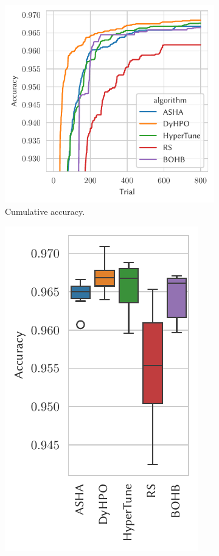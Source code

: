 \begin{figure}[H]
    \begin{subfigure}{.47\textwidth}
        \includegraphics[height=\plotheight]{img/real_exp/svhn_residual_plot.pdf}%
        \caption{Cumulative accuracy.}%
    \end{subfigure}%
    \begin{subfigure}{.26\textwidth}
        \includegraphics[height=\plotheight]{img/real_exp/svhn_residual_boxplot_half.pdf}%

\end{subfigure}
\end{figure}
